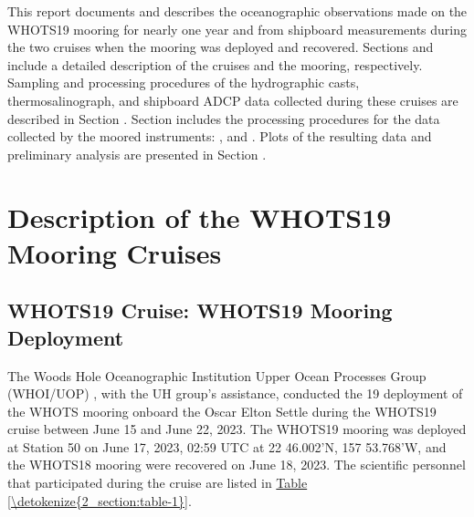 \documentclass[a4paper,10pt,english,openany,oneside]{sphinxmanual}
\begin{document}
\sphinxAtStartPar
This report documents and describes the oceanographic observations made on the
WHOTS\sphinxhyphen{}19 mooring for nearly one year and from shipboard
measurements during the two cruises when the mooring was deployed and
recovered. Sections
{\hyperref[\detokenize{2_section:description-of-the-whots-19-mooring-cruises}]{}} and
{\hyperref[\detokenize{3_section:description-of-whots-19-mooring}]{}} include a detailed
description of the cruises and the mooring, respectively. Sampling and
processing procedures of the hydrographic casts, thermosalinograph, and
shipboard ADCP data collected during these cruises are described in Section
{\hyperref[\detokenize{4_section:whots-19-20-cruise-shipboard-observations}]{}}. Section
{\hyperref[\detokenize{5_section:moored-instrument-observations}]{}} includes the processing
procedures for the data collected by the moored instruments:
{\hyperref[\detokenize{5_section:microcat-data-processing-procedures}]{}},
{\hyperref[\detokenize{5_section:acoustic-doppler-current-profiler}]{}} and
{\hyperref[\detokenize{5_section:vector-measuring-current-meter-vmcm}]{}}. Plots of the
resulting data and preliminary analysis are presented in Section
{\hyperref[\detokenize{6_section:results}]{}}.


\chapter{Description of the WHOTS\sphinxhyphen{}19 Mooring Cruises}
\label{\detokenize{2_section:description-of-the-whots-19-mooring-cruises}}\label{\detokenize{2_section::doc}}

\section{WHOTS\sphinxhyphen{}19 Cruise: WHOTS\sphinxhyphen{}19 Mooring Deployment}
\label{\detokenize{2_section:whots-19-cruise-whots-19-mooring-deployment}}
\sphinxAtStartPar
The Woods Hole Oceanographic Institution Upper Ocean Processes Group (WHOI/UOP)
, with the UH group’s assistance, conducted the 19 deployment of the WHOTS
mooring onboard the Oscar Elton Settle during the WHOTS\sphinxhyphen{}19 cruise between June
15 and June 22, 2023. The WHOTS\sphinxhyphen{}19 mooring was deployed at Station 50 on June
17, 2023, 02:59 UTC at 22 46.002’N, 157 53.768’W, and the WHOTS\sphinxhyphen{}18 mooring were
recovered on June 18, 2023. The scientific personnel that participated during
the cruise are listed in \hyperref[\detokenize{2_section:table-1}]{Table \ref{\detokenize{2_section:table-1}}}.
\end{document}
